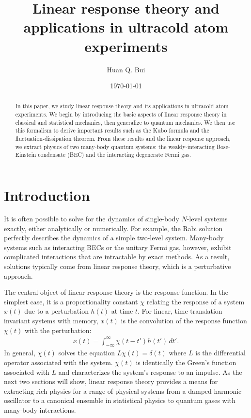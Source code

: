 \documentclass[prl,
twocolumn,
nofootinbib,
amsmath,amssymb,
aps]{revtex4-1}
\begin{document}
	
	

\title{Linear response theory and applications in ultracold atom experiments}
\author{Huan Q. Bui}
\date{\today}


\begin{abstract}
	In this paper, we study linear response theory and its applications in ultracold atom experiments. We begin by introducing the basic aspects of linear response theory in classical and statistical mechanics, then generalize to quantum mechanics. We then use this formalism to derive important results such as the Kubo formula and the fluctuation-dissipation theorem. From these results and the linear response approach, we extract physics of two many-body quantum systems: the weakly-interacting Bose-Einstein condensate (BEC) and the interacting degenerate Fermi gas.
\end{abstract}

\maketitle


\section{Introduction}



It is often possible to solve for the dynamics of single-body $N$-level systems exactly, either analytically or numerically. For example, the Rabi solution perfectly describes the dynamics of a simple two-level system. Many-body systems such as interacting BECs or the unitary Fermi gas, however, exhibit complicated interactions that are intractable by exact methods. As a result, solutions typically come from linear response theory, which is a perturbative approach.

The central object of linear response theory is the response function. In the simplest case, it is a proportionality constant $\chi$ relating the response of a system $x(t)$ due to a perturbation $h(t)$ at time $t$. For linear, time translation invariant systems with memory, $x(t)$ is the convolution of the response function $\chi(t)$ with the perturbation:
\begin{align}\label{eq:linear_response}
x(t) = \int_{-\infty}^{\infty} \chi(t-t') h(t') \,dt'.
\end{align}
In general, $\chi(t)$ solves the equation $ L \chi(t) = \delta(t)$ where $L$ is the differential operator associated with the system. $\chi(t)$ is identically the Green's function associated with $L$ and characterizes the system's response to an impulse. As the next two sections will show, linear response theory provides a means for extracting rich physics for a range of physical systems from a damped harmonic oscillator to a canonical ensemble in statistical physics to quantum gases with many-body interactions. 
\end{document}
